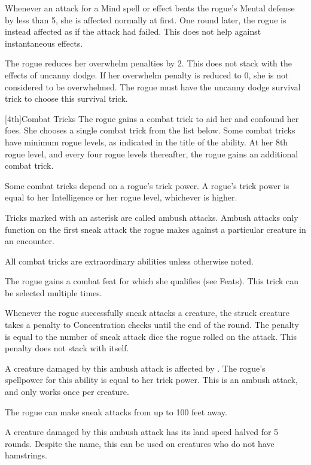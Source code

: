 Whenever an attack for a Mind spell or effect beats the rogue's Mental defense by less than 5, she is affected normally at first.
One round later, the rogue is instead affected as if the attack had failed.
This does not help against instantaneous effects.

The rogue reduces her overwhelm penalties by 2.
This does not stack with the effects of uncanny dodge.
If her overwhelm penalty is reduced to 0, she is not considered to be overwhelmed.
The rogue must have the uncanny dodge survival trick to choose this survival trick.

[4th]{Combat Tricks}
The rogue gains a combat trick to aid her and confound her foes.
She chooses a single combat trick from the list below.
Some combat tricks have minimum rogue levels, as indicated in the title of the ability.
At her 8th rogue level, and every four rogue levels thereafter, the rogue gains an additional combat trick.

Some combat tricks depend on a rogue's trick power.
A rogue's trick power is equal to her Intelligence or her rogue level, whichever is higher.

Tricks marked with an asterisk are called ambush attacks.
Ambush attacks only function on the first sneak attack the rogue makes against a particular creature in an encounter.

All combat tricks are extraordinary abilities unless otherwise noted.

The rogue gains a combat feat for which she qualifies (see Feats).
This trick can be selected multiple times.

Whenever the rogue successfully sneak attacks a creature, the struck creature takes a penalty to Concentration checks until the end of the round.
The penalty is equal to the number of sneak attack dice the rogue rolled on the attack.
This penalty does not stack with itself.

A creature damaged by this ambush attack is affected by .
The rogue's spellpower for this ability is equal to her trick power.
This is an ambush attack, and only works once per creature.

The rogue can make sneak attacks from up to 100 feet away.

A creature damaged by this ambush attack has its land speed halved for 5 rounds.
Despite the name, this can be used on creatures who do not have hamstrings.


